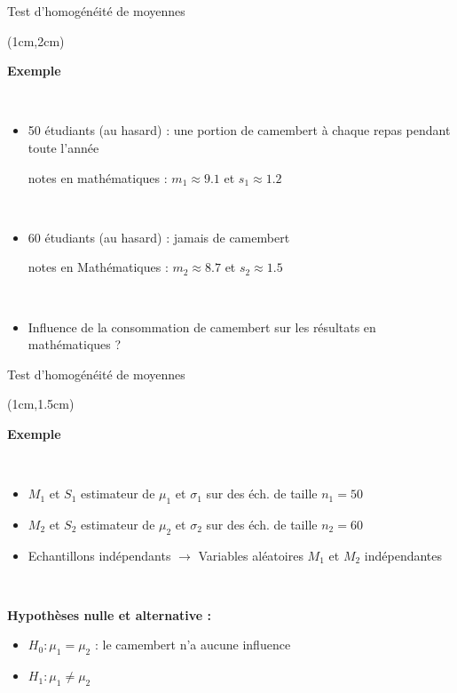 \documentclass{beamer}
\begin{document}
\begin{frame}{Test d'homogénéité de moyennes}
\begin{textblock*}{\textwidth}(1cm,2cm)

\begin{center}{\bf \Large Exemple } \end{center}
\

\begin{itemize}
\item 50 étudiants (au hasard)   : une portion de 
camembert à chaque repas pendant toute l'année 

notes en mathématiques : $m_1\approx 9.1$ et  $s_1\approx 1.2$

\

\item  60 étudiants (au hasard) : jamais de 
camembert 

notes en Mathématiques : $m_2\approx 8.7$ et $s_2\approx 1.5$

\

\item Influence de la consommation de camembert sur les résultats en mathématiques  ?
\end{itemize}

\end{textblock*}
\end{frame}


\begin{frame}{Test d'homogénéité de moyennes}
\begin{textblock*}{\textwidth}(1cm,1.5cm)

\begin{center}{\bf \Large Exemple } \end{center}


\

\begin{itemize}
\item $M_1$ et $S_1$ estimateur de $\mu_1$ et $\sigma_1$ sur des éch. de taille $n_1=50$
\item $M_2$ et $S_2$ estimateur de $\mu_2$ et $\sigma_2$ sur des éch. de taille $n_2=60$
\item Echantillons indépendants $\rightarrow$ Variables aléatoires $M_1$ et $M_2$ indépendantes
\end{itemize}

\

{\bf Hypothèses nulle et alternative :}

\begin{itemize}
\item $H_0 : \mu_1=\mu_2$ : le camembert n'a aucune influence
\item  $H_1 : \mu_1\neq\mu_2$
\end{itemize}

\end{textblock*}
\end{frame}
\end{document}
